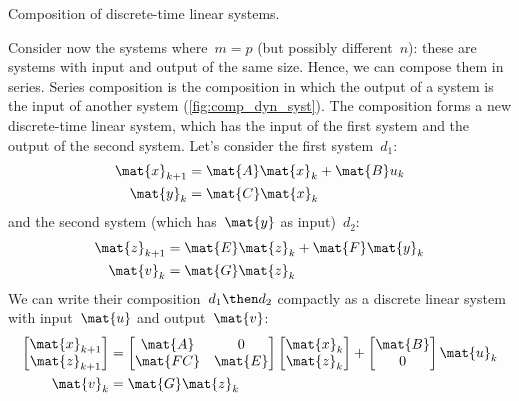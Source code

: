 \begin{marginfigure}
  \begin{center}
  \end{center}
  \caption{Composition of discrete-time linear systems.}
  \label{fig:comp_dyn_syst}
\end{marginfigure}

Consider now the systems where~$m=p$ (but possibly different~$n$): these are systems with input and output of the same size.
Hence, we can compose them in series.
Series composition is the composition in which the output of a system is the input of another system (\cref{fig:comp_dyn_syst}).
The composition forms a new discrete-time linear system, which has the input of the first system and the output of the second system.
Let's consider the first system~$d_1$:
\begin{equation*}
  \label{eq:dlin-1}
  \begin{aligned}
    \mat{x}_{k+1} &= \mat{A} \mat{x}_k + \mat{B} u_k \\
    \mat{y}_{k}   &= \mat{C} \mat{x}_k  \\
  \end{aligned}
\end{equation*}
and the second system (which has~$\mat{y}$ as input)~$d_2$:
\begin{equation*}
  \label{eq:dlin-2}
  \begin{aligned}
    \mat{z}_{k+1} &= \mat{E} \mat{z}_k + \mat{F} \mat{y}_k \\
    \mat{v}_{k}   &= \mat{G} \mat{z}_k  \\
  \end{aligned}
\end{equation*}
We can write their composition~$d_1\then d_2$ compactly as a discrete linear system with input~$\mat{u}$ and output~$\mat{v}$:
\begin{equation*}
  \label{eq:dlin-3}
  \begin{aligned}
    \begin{bmatrix}
      \mat{x}_{k+1}\\
      \mat{z}_{k+1}
    \end{bmatrix}&=
    \begin{bmatrix}
      \mat{A}&0\\
      \mat{FC}&\mat{E}
    \end{bmatrix}\begin{bmatrix}
                   \mat{x}_k\\ \mat{z}_k
    \end{bmatrix}+
    \begin{bmatrix}
      \mat{B}\\ 0
    \end{bmatrix}\mat{u}_k\\
    \mat{v}_k&=\mat{G}\mat{z}_k
  \end{aligned}
\end{equation*}


